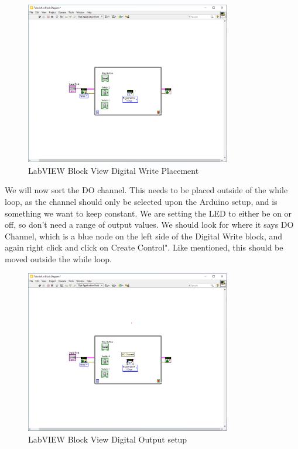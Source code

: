 \documentclass[a4paper,11pt]{report}
\begin{document}
\begin{figure}[H]
\centering
\includegraphics[width=0.8\textwidth]{screenshots/labview19}
\caption{LabVIEW Block View Digital Write Placement}
\end{figure}

We will now sort the DO channel. This needs to be placed outside of the while loop, as the channel should only be selected upon the Arduino setup, and is something we want to keep constant. We are setting the LED to either be on or off, so don't need a range of output values. We should look for where it says DO Channel, which is a blue node on the left side of the Digital Write block, and again right click and click on Create Control". Like mentioned, this should be moved outside the while loop.

\begin{figure}[H]
\centering
\includegraphics[width=0.8\textwidth]{screenshots/labview20}
\caption{LabVIEW Block View Digital Output setup}
\end{figure}
\end{document}

